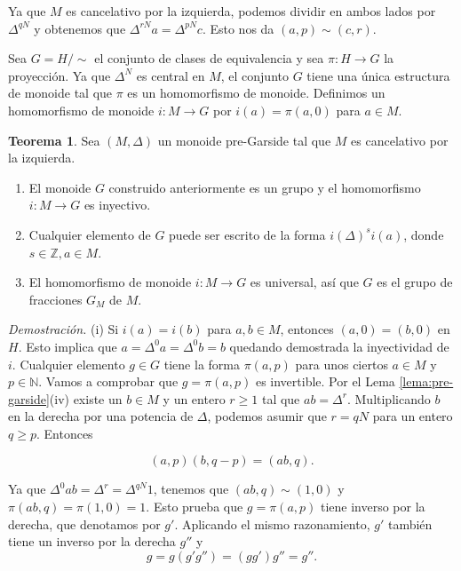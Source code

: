 \documentclass[12pt]{article}
\theoremstyle{definition}
\newtheorem{teor}{Teorema}[section]
\begin{document}
Ya que $M$ es cancelativo por la izquierda, podemos dividir en ambos lados por $\Delta^{qN}$ y obtenemos que $\Delta^{rN}a=\Delta^{pN}c$. Esto nos da $(a,p)\sim(c,r)$.

Sea $G=H/\sim$ el conjunto de clases de equivalencia y sea $\pi:H\rightarrow G$ la proyección. Ya que $\Delta^N$ es central en $M$, el conjunto $G$ tiene una única estructura de monoide tal que $\pi$ es un homomorfismo de monoide. Definimos un homomorfismo de monoide $i:M\rightarrow G$ por $i(a)=\pi(a,0)$ para $a\in M$.

\begin{teor}
Sea $(M,\Delta)$ un monoide pre-Garside tal que $M$ es cancelativo por la izquierda.
\begin{enumerate}[label=(\roman*).]
\item El monoide $G$ construido anteriormente es un grupo y el homomorfismo $i:M\rightarrow G$ es inyectivo.
\item Cualquier elemento de $G$ puede ser escrito de la forma $i(\Delta)^si(a)$, donde $s\in\mathbb{Z}, a\in M$.
\item El homomorfismo de monoide $i:M\rightarrow G$ es universal, así que $G$ es el grupo de fracciones $G_M$ de $M$.
\end{enumerate}
\label{teor:pre-garside}
\end{teor}

\textit{Demostración.} (i) Si $i(a)=i(b)$ para $a,b\in M$, entonces $(a,0)=(b,0)$ en $H$. Esto implica que $a=\Delta^0a=\Delta^0b=b$ quedando demostrada la inyectividad de $i$.
\newline
\newline
Cualquier elemento $g\in G$ tiene la forma $\pi(a,p)$ para unos ciertos $a\in M$ y $p\in\mathbb{N}$. Vamos a comprobar que $g=\pi(a,p)$ es invertible. Por el Lema \ref{lema:pre-garside}(iv) existe un $b\in M$ y un entero $r\geq 1$ tal que $ab=\Delta^r$. Multiplicando $b$ en la derecha por una potencia de $\Delta$, podemos asumir que $r=qN$ para un entero $q\geq p$. Entonces


\begin{equation}
(a,p)(b,q-p)=(ab,q).
\label{eq:gr-frac}
\end{equation}

Ya que $\Delta^0ab=\Delta^r=\Delta^{qN}1$, tenemos que $(ab,q)\sim(1,0)$ y $\pi(ab,q)=\pi(1,0)=1$. Esto prueba que $g=\pi(a,p)$ tiene inverso por la derecha, que denotamos por $g'$. Aplicando el mismo razonamiento, $g'$ también tiene un inverso por la derecha  $g''$ y
$$g=g(g'g'')=(gg')g''=g''.$$
\end{document}
